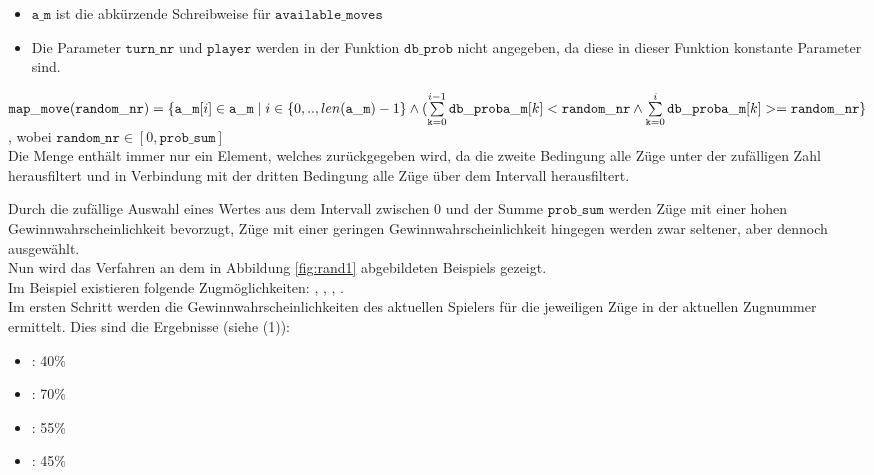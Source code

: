 \begin{itemize}
\begin{itemize}
\item $\mathtt{a\_m}$ ist die abkürzende Schreibweise für $\mathtt{available\_moves}$
\item Die Parameter $\mathtt{turn\_nr}$ und $\mathtt{player}$ werden in der Funktion $\mathtt{db\_prob}$ nicht angegeben, da diese in dieser Funktion konstante Parameter sind.
\end{itemize}
\vspace{0.25cm}
$\mathtt{map\_move}(\mathtt{random\_nr}) = \{ \mathtt{a\_m}[i] \in \mathtt{a\_m} \mid  \\i \in \{0, .. , len(\mathtt{a\_m}) - 1\} \land (\sum\limits_{\mathtt{k} = 0}^{i - 1}{\mathtt{db\_prob}\mathtt{a\_m}[k] < \mathtt{random\_nr}} \\\land \sum\limits_{\mathtt{k} = 0}^{i}{\mathtt{db\_prob}\mathtt{a\_m}[k] >= \mathtt{random\_nr}}  \}$, wobei $\mathtt{random\_nr} \in [0, \mathtt{prob\_sum}]$
\vspace{0.25cm}\\Die Menge enthält immer nur ein Element, welches zurückgegeben wird, da die zweite Bedingung alle Züge unter der zufälligen Zahl herausfiltert und in Verbindung mit der dritten Bedingung alle Züge über dem Intervall herausfiltert.
\end{itemize}
Durch die zufällige Auswahl eines Wertes aus dem Intervall zwischen $0$ und der Summe $\mathtt{prob\_sum}$ werden Züge mit einer hohen Gewinnwahrscheinlichkeit bevorzugt, Züge mit einer geringen Gewinnwahrscheinlichkeit hingegen werden zwar seltener, aber dennoch ausgewählt.
\\Nun wird das Verfahren an dem in Abbildung \ref{fig:rand1} abgebildeten Beispiels gezeigt.
\vspace{0,5cm}
\\
Im Beispiel existieren folgende Zugmöglichkeiten: , , , .
\\Im ersten Schritt werden die Gewinnwahrscheinlichkeiten des aktuellen Spielers für die jeweiligen Züge in der aktuellen Zugnummer ermittelt. Dies sind die Ergebnisse (siehe (1)):
\begin{itemize}
\item {}: 40\%
\item {}: 70\%
\item {}: 55\%
\item {}: 45\%
\end{itemize}
